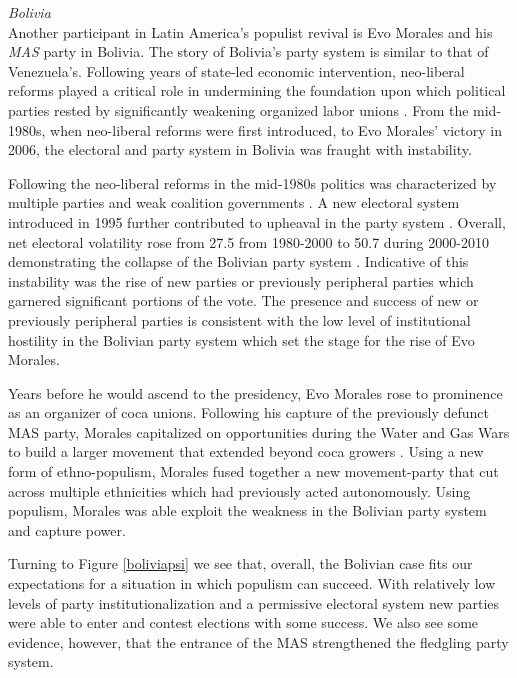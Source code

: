\documentclass[a4paper,12pt]{article}\usepackage[]{graphicx}\usepackage[]{color}
\begin{document}
\noindent 
\textit{Bolivia} \\
Another participant in Latin America's populist revival \citep{roberts2007latin} is Evo Morales and his \textit{MAS} party in Bolivia. The story of Bolivia's party system is similar to that of Venezuela's. Following years of state-led economic intervention, neo-liberal reforms played a critical role in undermining the foundation upon which political parties rested by significantly weakening organized labor unions \citep{crabtree2013mnr, roberts2013market}. From the mid-1980s, when neo-liberal reforms were first introduced, to Evo Morales' victory in 2006, the electoral and party system in Bolivia was fraught with instability. 
\par
Following the neo-liberal reforms in the mid-1980s politics was characterized by multiple parties and weak coalition governments \citep{crabtree2013mnr}. A new  electoral system introduced in 1995 further contributed to upheaval in the party system \citep{centellas2009electoral}. Overall, net electoral volatility rose from 27.5 from 1980-2000 to 50.7 during 2000-2010 demonstrating the collapse of the Bolivian party system \citep[pg. 1441]{roberts2013market}. Indicative of this instability was the rise of new parties or previously peripheral parties which garnered significant portions of the vote. The presence and success of new or previously peripheral parties is consistent with the low level of institutional hostility in the Bolivian party system which set the stage for the rise of Evo Morales. 
\par
Years before he would ascend to the presidency, Evo Morales rose to prominence as an organizer of coca unions. Following his capture of the previously defunct MAS party, Morales capitalized on opportunities during the Water and Gas Wars to build a larger movement that extended beyond coca growers \citep{webber2011rebellion}. Using a new form of ethno-populism, Morales fused together a new movement-party that cut across multiple ethnicities which had previously acted autonomously. Using populism, Morales was able exploit the weakness in the Bolivian party system and capture power. 
\par
Turning to Figure \ref{boliviapsi} we see that, overall, the Bolivian case fits our expectations for a situation in which populism can succeed. With relatively low levels of party institutionalization and a permissive electoral system new parties were able to enter and contest elections with some success. We also see some evidence, however, that the entrance of the MAS strengthened the fledgling party system. 
\end{document}
